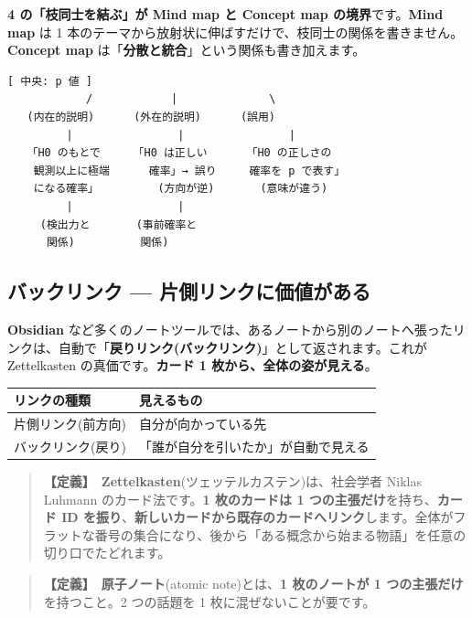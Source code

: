 \documentclass{article}
\begin{document}
\textbf{4 の「枝同士を結ぶ」が Mind map と Concept map の境界}です。\textbf{Mind map} は 1 本のテーマから放射状に伸ばすだけで、枝同士の関係を書きません。\textbf{Concept map} は「\textbf{分散と統合}」という関係も書き加えます。

\begin{lstlisting}[language=Text]
                        [ 中央: p 値 ]
            /            |              \
   (内在的説明)      (外在的説明)      (誤用)
         |                |                |
   「H0 のもとで     「H0 は正しい      「H0 の正しさの
    観測以上に極端      確率」→ 誤り     確率を p で表す」
    になる確率」         (方向が逆)       (意味が違う)
         |                |
     (検出力と       (事前確率と
      関係)          関係)
\end{lstlisting}

\subsection{バックリンク — 片側リンクに価値がある}

\textbf{Obsidian} など多くのノートツールでは、あるノートから別のノートへ張ったリンクは、自動で「\textbf{戻りリンク(バックリンク)}」として返されます。これが Zettelkasten の真価です。\textbf{カード 1 枚から、全体の姿が見える}。

\begin{center}
\begin{tabular}{|l|l|}
\hline
リンクの種類 & 見えるもの \\
\hline
片側リンク(前方向) & 自分が向かっている先 \\
\hline
バックリンク(戻り) & 「誰が自分を引いたか」が自動で見える \\
\hline
\end{tabular}
\end{center}

\begin{quote}
\textbf{【定義】}\ \textbf{Zettelkasten}(ツェッテルカステン)は、社会学者 Niklas Luhmann のカード法です。\textbf{1 枚のカードは 1 つの主張だけ}を持ち、\textbf{カード ID を振り}、\textbf{新しいカードから既存のカードへリンク}します。全体がフラットな番号の集合になり、後から「ある概念から始まる物語」を任意の切り口でたどれます。
\end{quote}

\begin{quote}
\textbf{【定義】}\ \textbf{原子ノート}(atomic note)とは、\textbf{1 枚のノートが 1 つの主張だけ}を持つこと。2 つの話題を 1 枚に混ぜないことが要です。
\end{quote}
\end{document}
